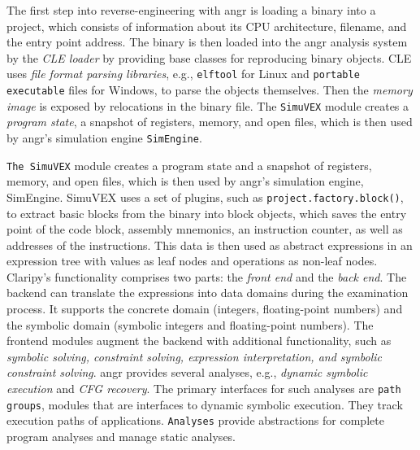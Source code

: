 \documentclass[seminar]{plai}
\begin{document}
The first step into reverse-engineering with angr is loading a binary into a project, which consists of information about its CPU architecture, filename, and the entry point address.\cite{core-concepts} The binary is then loaded into the angr analysis system by the \textit{CLE loader} by providing base classes for reproducing binary objects.
CLE uses \textit{file format parsing libraries}, e.g., \texttt{elftool} for Linux and \texttt{portable executable} files for Windows, to parse the objects themselves.
Then the \textit{memory image} is exposed by relocations in the binary file.\cite{art-of-war-angr}
The \texttt{SimuVEX} module creates a \textit{program state}, a snapshot of registers, memory, and open files, which is then used by angr's simulation engine \texttt{SimEngine}.

\texttt{The SimuVEX} module creates a program state and a snapshot of registers, memory, and open files, which is then used by angr's simulation engine, SimEngine. SimuVEX uses a set of plugins, such as \texttt{project.factory.block()}, to extract basic blocks from the binary into block objects, which saves the entry point of the code block, assembly mnemonics, an instruction counter, as well as addresses of the instructions.\cite{art-of-war-angr} This data is then used as abstract expressions in an expression tree with values as leaf nodes and operations as non-leaf nodes.\\

Claripy's functionality comprises two parts: the \textit{front end} and the \textit{back end}. The backend can translate the expressions into data domains during the examination process. It supports the concrete domain (integers, floating-point numbers) and the symbolic domain (symbolic integers and floating-point numbers).
The frontend modules augment the backend with additional functionality, such as \textit{symbolic solving, constraint solving, expression interpretation, and symbolic constraint solving}.
angr provides several analyses, e.g., \textit{dynamic symbolic execution} and \textit{CFG recovery}. The primary interfaces for such analyses are \texttt{path groups}, modules that are interfaces to dynamic symbolic execution. They track execution paths of applications. \texttt{Analyses} provide abstractions for complete program analyses and manage static analyses.
\end{document}
